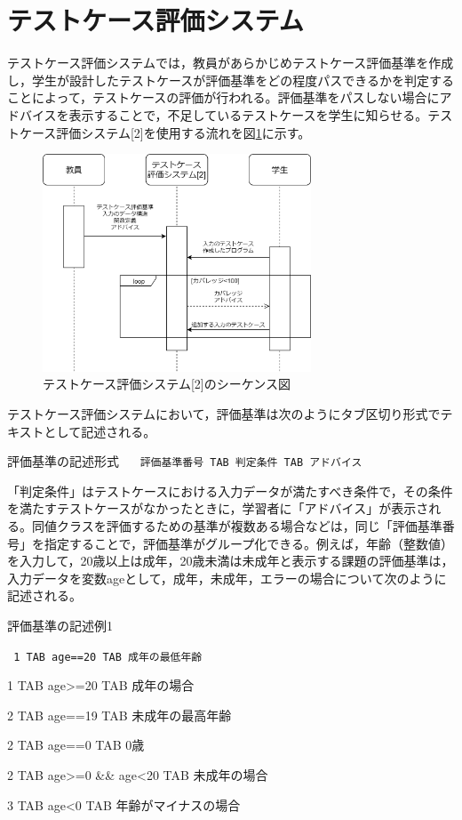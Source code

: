 \documentclass{tpu-sotu}
\begin{document}
\section{テストケース評価システム}
テストケース評価システムでは，教員があらかじめテストケース評価基準を作成し，学生が設計したテストケースが評価基準をどの程度パスできるかを判定することによって，テストケースの評価が行われる。評価基準をパスしない場合にアドバイスを表示することで，不足しているテストケースを学生に知らせる。テストケース評価システム[2]を使用する流れを図\ref{b1}に示す。
\begin{figure}[h]
  \centering
  \includegraphics[width=80mm]{シーケンス図1.png}
  \caption{テストケース評価システム[2]のシーケンス図}
  \label{b1}
\end{figure}テストケース評価システムにおいて，評価基準は次のようにタブ区切り形式でテキストとして記述される。\\
\begin{minipage}[b]{\textwidth}
\begin{itembox}[l]{評価基準の記述形式}
{\tt
　評価基準番号 TAB 判定条件 TAB アドバイス
}
\end{itembox}
\end{minipage}

「判定条件」はテストケースにおける入力データが満たすべき条件で，その条件を満たすテストケースがなかったときに，学習者に「アドバイス」が表示される。同値クラスを評価するための基準が複数ある場合などは，同じ「評価基準番号」を指定することで，評価基準がグループ化できる。例えば，年齢（整数値）を入力して，20歳以上は成年，20歳未満は未成年と表示する課題の評価基準は，入力データを変数ageとして，成年，未成年，エラーの場合について次のように記述される。\\
\begin{minipage}[b]{\textwidth}
\begin{itembox}[l]{評価基準の記述例1}
{\tt
1 TAB age==20 TAB 成年の最低年齢

1 TAB age>=20 TAB 成年の場合

2 TAB age==19 TAB 未成年の最高年齢

2 TAB age==0 TAB 0歳

2 TAB age>=0 \&\& age<20 TAB 未成年の場合

3 TAB age<0 TAB 年齢がマイナスの場合
}
\end{itembox}
\end{minipage}
\end{document}
